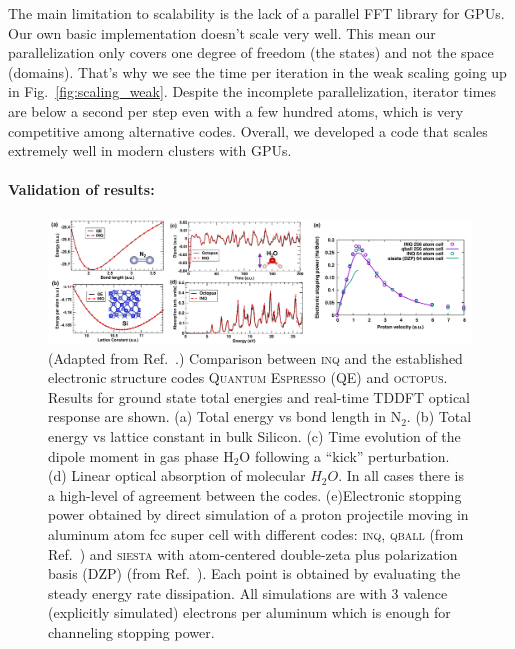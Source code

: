 The main limitation to scalability is the lack of a parallel FFT library for GPUs. 
Our own basic implementation doesn't scale very well. 
This mean our parallelization only covers one degree of freedom (the states) and not the space (domains). 
That's why we see the time per iteration in the weak scaling going up in Fig.~\ref{fig:scaling_weak}.
Despite the incomplete parallelization, iterator times are below a second per step even with a few hundred atoms, which is very competitive among alternative codes.
Overall, we developed a code that scales extremely well in modern clusters with GPUs.

\paragraph{Validation of results:}
\begin{figure}[h]
	\centering
	\includegraphics[width=1.0\linewidth]{figures/Results-Fig.pdf}
	\caption{
		(Adapted from Ref.~\cite{Andrade2021}.) 
		Comparison between \textsc{inq} and the established electronic structure codes \textsc{Quantum Espresso} (QE) and \textsc{octopus}.
Results for ground state total energies and real-time TDDFT optical response are shown. 
		(a) Total energy vs bond length in \(\mathrm{N_2}\).
		(b) Total energy vs lattice constant in bulk Silicon. 
		(c) Time evolution of the dipole moment in gas phase \(\mathrm{H_2O}\) following a ``kick'' perturbation. 
		(d) Linear optical absorption of molecular \(H_2O\). 
		In all cases there is a high-level of agreement between the codes.
		(e)Electronic stopping power obtained by direct simulation of a proton projectile moving in aluminum atom fcc super cell with different codes: \textsc{inq}, \textsc{qball} (from Ref.~\cite{Schleife2015}) and \textsc{siesta} with atom-centered double-zeta plus polarization basis (DZP) (from Ref.~\cite{Correa2012}).
		Each point is obtained by evaluating the steady energy rate dissipation.
		All simulations are with 3 valence (explicitly simulated) electrons per aluminum which is enough for channeling stopping power.
	}
	\label{fig:inq_results}
\end{figure}

